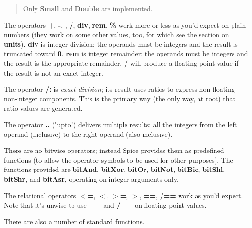 \documentclass{report}
\begin{document}
\begin{quote}Only {\bf Small} and {\bf Double} are implemented.\end{quote}The operators {\bf +}, {\bf -}, {\bf *}, {\bf /}, {\bf div}, {\bf rem}, {\bf \%} work more-or-less as
you'd expect on plain numbers (they work on some other values, too, for which
see the section on {\bf units}). {\bf div} is integer division; the operands must be
integers and the result is truncated toward {\bf 0}. {\bf rem} is integer remainder;
the operands must be integers and the result is the appropriate remainder. {\bf /}
will produce a floating-point value if the result is not an exact integer.

The operator {\bf /:} is {\em exact division}; its result uses ratios to express
non-floating non-integer components. This is the primary way (the only way, at
root) that ratio values are generated.

The operator {\bf ..} ("upto") delivers multiple results: all the integers
from the left operand (inclusive) to the right operand (also
inclusive).

There are no bitwise operators; instead Spice provides them as predefined
functions (to allow the operator symbols to be used for other purposes).
The functions provided are {\bf bitAnd}, {\bf bitXor}, {\bf bitOr}, {\bf bitNot}, {\bf bitBic},
{\bf bitShl}, {\bf bitShr}, and {\bf bitAsr}, operating on integer arguments only.

The relational operators {\bf $<$=}, {\bf $<$}, {\bf $>$=}, {\bf $>$}, {\bf ==}, {\bf /==} work as you'd
expect. Note that it's unwise to use {\bf ==} and {\bf /==} on floating-point values.

There are also a number of standard functions.
\end{document}
